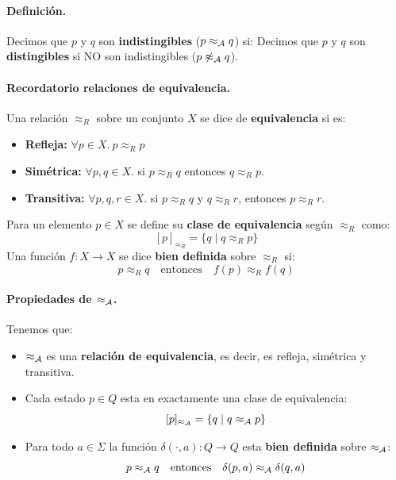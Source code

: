\paragraph{Definición.} Decimos que $p$ y $q$ son \textbf{indistingibles} ($p \approx_{\mathcal{A}} q$) si:
Decimos que $p$ y $q$ son \textbf{distingibles} si NO son indistingibles ($p \not\approx_{\mathcal{A}} q$).

\paragraph{Recordatorio relaciones de equivalencia.} Una relación $\approx_R$ sobre un conjunto $X$ se dice de \textbf{equivalencia} si es:
\begin{itemize}
    \item \textbf{Refleja:} $\forall p \in X.\ p \approx_R p$
    \item \textbf{Simétrica:}  $\forall p,q \in X.$ si $p \approx_R q$ entonces $q \approx_R p$.
    \item \textbf{Transitiva:} $\forall p,q,r \in X.$ si $p \approx_R q$ y $q \approx_R r$, entonces $p \approx_R r$.
\end{itemize}

Para un elemento $p \in X$ se define su \textbf{clase de equivalencia} según $\approx_R$ como:
$$
    [p]_{\approx_R} = \{q \mid q \approx_R p\}
$$
Una función $f: X \to X$ se dice \textbf{bien definida} sobre $\approx_R$ si:
$$
    p \approx_R q \quad \text{entonces} \quad f(p) \approx_R f(q)
$$

\paragraph{Propiedades de $\approx_{\mathcal{A}}$.} Tenemos que:
\begin{itemize}
    \item $\approx_{\mathcal{A}}$ es una \textbf{relación de equivalencia}, es decir, es refleja, simétrica y transitiva.
    \item Cada estado $p \in Q$ esta en exactamente una clase de equivalencia:
          $$
              [p]_{\approx_{\mathcal{A}}} = \{q \mid q \approx_{\mathcal{A}} p\}
          $$
    \item Para todo $a \in \Sigma$ la función $\delta(\cdot, a): Q \to Q$ esta \textbf{bien definida} sobre $\approx_{\mathcal{A}}$:
          $$
              p \approx_{\mathcal{A}} q \quad \text{entonces} \quad \delta(p,a) \approx_{\mathcal{A}} \delta(q,a)
          $$
\end{itemize}

